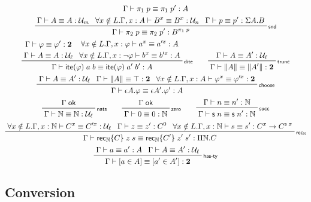 \documentclass[acmsmall,screen,review]{acmart}
\newcommand{\mc}[1]{\ensuremath{\mathcal{#1}}}
\newcommand{\mb}[1]{\ensuremath{\mathbf{#1}}}
\newcommand{\ms}[1]{\ensuremath{\mathsf{#1}}}
\newcommand{\rle}[1]{{\scriptsize\textsf{#1}}}
\newcommand{\nats}{\mathbb{N}}
\newcommand{\isok}[1]{#1\;\ms{ok}}
\newcommand{\jeq}[4]{#1 \vdash #2 \equiv #3 : #4}
\newcommand{\dite}[3]{\ms{ite}(#1)\;#2\;#3}
\newcommand{\natrec}[3]{\ms{rec}_\nats\{#1\}\;#2\;#3}
\newcommand{\mhasty}[2]{[#1 \in #2]}
\newcommand{\opv}[2]{#1^{#2}}
\begin{document}
\begin{gather*}
        {\jeq{\Gamma}{\pi_1\;p}{\pi_1\;p'}{A}} \\
    \prftree[r]{\rle{snd}}
        {\jeq{\Gamma}{A}{A}{\mc{U}_m}}
        {\forall x \notin L .
            \jeq{\Gamma, x : A}{\opv{B}{x}}{\opv{B}{x}}{\mc{U}_n}}
        {\jeq{\Gamma}{p}{p'}{\Sigma A . B}}
        {\jeq{\Gamma}{\pi_2\;p}{\pi_2\;p'}{\opv{B}{\pi_1\;p}}} \\
    \prftree[r]{\rle{dite}}
        {
        \prfStackPremises
        {\jeq{\Gamma}{\varphi}{\varphi'}{\mb{2}}}
        {\jeq{\Gamma}{A}{A}{\mc{U}_\ell}}
        }
        {
        \prfStackPremises
        {\forall x \notin L .
            \jeq{\Gamma, x : \varphi}{\opv{a}{x}}{\opv{a'}{x}}{A}}
        {\forall x \notin L .
            \jeq{\Gamma, x : \lnot\varphi}{\opv{b}{x}}{\opv{b'}{x}}{A}}
        }
        {\jeq{\Gamma}{\dite{\varphi}{a}{b}}{\dite{\varphi}{a'}{b'}}{A}} \qquad
    \prftree[r]{\rle{trunc}}
        {\jeq{\Gamma}{A}{A'}{\mc{U}_\ell}}
        {\jeq{\Gamma}{\|A\|}{\|A'\|}{\mb{2}}} \\
    \prftree[r]{\rle{choose}}
        {\jeq{\Gamma}{A}{A'}{\mc{U}_\ell}}
        {\jeq{\Gamma}{\|A\|}{\top}{\mb{2}}}
        {\forall x \notin L . 
            \jeq{\Gamma, x : A}{\opv{\varphi}{x}}{\opv{\varphi'}{x}}{\mb{2}}}
        {\jeq{\Gamma}{\epsilon A . \varphi}{\epsilon A' . \varphi'}{A}} \\
    \prftree[r]{\rle{nats}}
        {\isok{\Gamma}}
        {\jeq{\Gamma}{\nats}{\nats}{\mc{U}_\ell}} \qquad
    \prftree[r]{\rle{zero}}
        {\isok{\Gamma}}
        {\jeq{\Gamma}{0}{0}{\nats}} \qquad
    \prftree[r]{\rle{succ}}
        {\jeq{\Gamma}{n}{n'}{\nats}}
        {\jeq{\Gamma}{\ms{s}\;n}{\ms{s}\;n'}{\nats}} \\
    \prftree[r]{\rle{rec$_\nats$}}
        {\forall x \notin L . \jeq{\Gamma, x : \nats}{\opv{C}{x}}{\opv{C'}{x}}{\mc{U}_\ell}}
        {\jeq{\Gamma}{z}{z'}{\opv{C}{0}}}
        {\forall x \notin L . \jeq{\Gamma, x : \nats}{s}{s'}{\opv{C}{x} \to \opv{C}{\ms{s}\;x}}}
        {\jeq{\Gamma}{\natrec{C}{z}{s}}{\natrec{C'}{z'}{s'}}{\Pi \nats . C}} \\
    \prftree[r]{\rle{has-ty}}
        {\jeq{\Gamma}{a}{a'}{A}}
        {\jeq{\Gamma}{A}{A'}{\mc{U}_\ell}}
        {\jeq{\Gamma}{\mhasty{a}{A}}{\mhasty{a'}{A'}}{\mb{2}}}
\end{gather*}

\subsection{Conversion}
\end{document}
